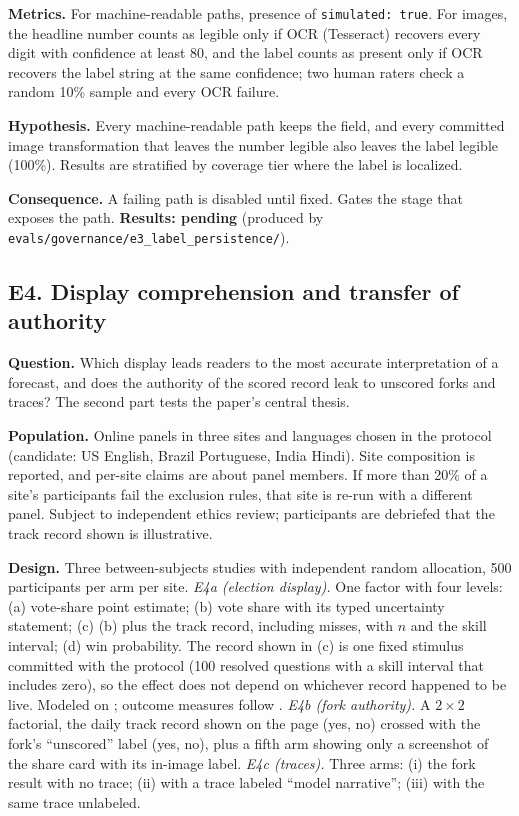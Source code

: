 \documentclass[11pt]{article}
\newcommand{\pending}[1]{\textbf{Results: pending} (produced by \nolinkurl{#1}).}
\begin{document}
\textbf{Metrics.} For machine-readable paths, presence of \texttt{simulated: true}. For images, the headline number counts as legible only if OCR (Tesseract) recovers every digit with confidence at least 80, and the label counts as present only if OCR recovers the label string at the same confidence; two human raters check a random 10\% sample and every OCR failure.

\textbf{Hypothesis.} Every machine-readable path keeps the field, and every committed image transformation that leaves the number legible also leaves the label legible (100\%). Results are stratified by coverage tier where the label is localized.

\textbf{Consequence.} A failing path is disabled until fixed. Gates the stage that exposes the path.
\pending{evals/governance/e3_label_persistence/}

\subsection{E4. Display comprehension and transfer of authority}
\textbf{Question.} Which display leads readers to the most accurate interpretation of a forecast, and does the authority of the scored record leak to unscored forks and traces? The second part tests the paper's central thesis.

\textbf{Population.} Online panels in three sites and languages chosen in the protocol (candidate: US English, Brazil Portuguese, India Hindi). Site composition is reported, and per-site claims are about panel members. If more than 20\% of a site's participants fail the exclusion rules, that site is re-run with a different panel. Subject to independent ethics review; participants are debriefed that the track record shown is illustrative.

\textbf{Design.} Three between-subjects studies with independent random allocation, 500 participants per arm per site.
\emph{E4a (election display).} One factor with four levels: (a) vote-share point estimate; (b) vote share with its typed uncertainty statement; (c) (b) plus the track record, including misses, with $n$ and the skill interval; (d) win probability. The record shown in (c) is one fixed stimulus committed with the protocol (100 resolved questions with a skill interval that includes zero), so the effect does not depend on whichever record happened to be live. Modeled on \citet{westwood2020projecting}; outcome measures follow \citet{hullman2019error}.
\emph{E4b (fork authority).} A $2\times 2$ factorial, the daily track record shown on the page (yes, no) crossed with the fork's ``unscored'' label (yes, no), plus a fifth arm showing only a screenshot of the share card with its in-image label.
\emph{E4c (traces).} Three arms: (i) the fork result with no trace; (ii) with a trace labeled ``model narrative''; (iii) with the same trace unlabeled.
\end{document}
